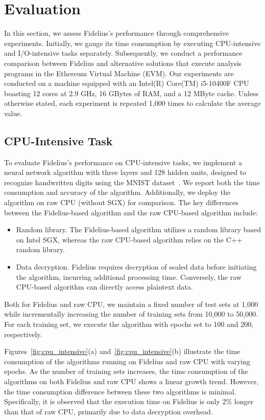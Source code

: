 \section{Evaluation}\label{sec:eval}


In this section, we assess Fidelius's performance through comprehensive experiments. Initially, we gauge its time consumption by executing CPU-intensive and I/O-intensive tasks separately. Subsequently, we conduct a performance comparison between Fidelius and alternative solutions that execute analysis programs in the Ethereum Virtual Machine (EVM). Our experiments are conducted on a machine equipped with an Intel(R) Core(TM) i5-10400F CPU boasting 12 cores at 2.9 GHz, 16 GBytes of RAM, and a 12 MByte cache. Unless otherwise stated, each experiment is repeated 1,000 times to calculate the average value.

\subsection{CPU-Intensive Task}
To evaluate Fidelius's performance on CPU-intensive tasks, we implement a neural network algorithm with three layers and 128 hidden units, designed to recognize handwritten digits using the MNIST dataset~\cite{mnist}. We report both the time consumption and accuracy of the algorithm. Additionally, we deploy the algorithm on raw CPU (without SGX) for comparison. The key differences between the Fidelius-based algorithm and the raw CPU-based algorithm include:
\begin{itemize}
  \item Random library. The Fidelius-based algorithm utilizes a random library based on Intel SGX, whereas the raw CPU-based algorithm relies on the C++ random library.
  \item Data decryption. Fidelius requires decryption of sealed data before initiating the algorithm, incurring additional processing time. Conversely, the raw CPU-based algorithm can directly access plaintext data.
\end{itemize}
Both for Fidelius and raw CPU, we maintain a fixed number of test sets at 1,000 while incrementally increasing the number of training sets from 10,000 to 50,000. For each training set, we execute the algorithm with epochs set to 100 and 200, respectively.



Figures~\ref{fig:cpu_intensive}(a) and~\ref{fig:cpu_intensive}(b) illustrate the time consumption of the algorithms running on Fidelius and raw CPU with varying epochs. As the number of training sets increases, the time consumption of the algorithms on both Fidelius and raw CPU shows a linear growth trend. However, the time consumption difference between these two algorithms is minimal. Specifically, it is observed that the execution time on Fidelius is only 2\% longer than that of raw CPU, primarily due to data decryption overhead.

